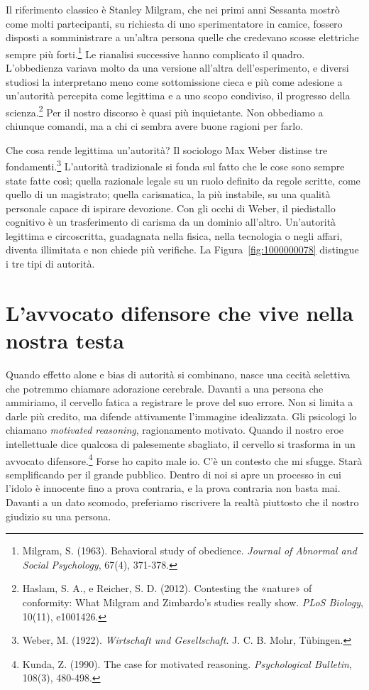 Il riferimento classico è Stanley Milgram, che nei primi anni Sessanta mostrò come molti partecipanti, su richiesta di uno sperimentatore in camice, fossero disposti a somministrare a un'altra persona quelle che credevano scosse elettriche sempre più forti.\footnote{Milgram, S. (1963). Behavioral study of obedience. \textit{Journal of Abnormal and Social Psychology}, 67(4), 371-378.} Le rianalisi successive hanno complicato il quadro. L'obbedienza variava molto da una versione all'altra dell'esperimento, e diversi studiosi la interpretano meno come sottomissione cieca e più come adesione a un'autorità percepita come legittima e a uno scopo condiviso, il progresso della scienza.\footnote{Haslam, S. A., e Reicher, S. D. (2012). Contesting the «nature» of conformity: What Milgram and Zimbardo's studies really show. \textit{PLoS Biology}, 10(11), e1001426.} Per il nostro discorso è quasi più inquietante. Non obbediamo a chiunque comandi, ma a chi ci sembra avere buone ragioni per farlo.

Che cosa rende legittima un'autorità? Il sociologo Max Weber distinse tre fondamenti.\footnote{Weber, M. (1922). \textit{Wirtschaft und Gesellschaft}. J. C. B. Mohr, T\"ubingen.} L'autorit\`{a} tradizionale si fonda sul fatto che le cose sono sempre state fatte cos\`{i}; quella razionale legale su un ruolo definito da regole scritte, come quello di un magistrato; quella carismatica, la pi\`{u} instabile, su una qualit\`{a} personale capace di ispirare devozione. Con gli occhi di Weber, il piedistallo cognitivo \`{e} un trasferimento di carisma da un dominio all'altro. Un'autorit\`{a} legittima e circoscritta, guadagnata nella fisica, nella tecnologia o negli affari, diventa illimitata e non chiede pi\`{u} verifiche. La Figura~\ref{fig:1000000078} distingue i tre tipi di autorità.

\section{L'avvocato difensore che vive nella nostra testa}

Quando effetto alone e bias di autorit\`{a} si combinano, nasce una cecit\`{a} selettiva che potremmo chiamare adorazione cerebrale. Davanti a una persona che ammiriamo, il cervello fatica a registrare le prove del suo errore. Non si limita a darle pi\`{u} credito, ma difende attivamente l'immagine idealizzata. Gli psicologi lo chiamano \textit{motivated reasoning}, ragionamento motivato. Quando il nostro eroe intellettuale dice qualcosa di palesemente sbagliato, il cervello si trasforma in un avvocato difensore.\footnote{Kunda, Z. (1990). The case for motivated reasoning. \textit{Psychological Bulletin}, 108(3), 480-498.} Forse ho capito male io. C'\`{e} un contesto che mi sfugge. Star\`{a} semplificando per il grande pubblico. Dentro di noi si apre un processo in cui l'idolo \`{e} innocente fino a prova contraria, e la prova contraria non basta mai. Davanti a un dato scomodo, preferiamo riscrivere la realt\`{a} piuttosto che il nostro giudizio su una persona.

